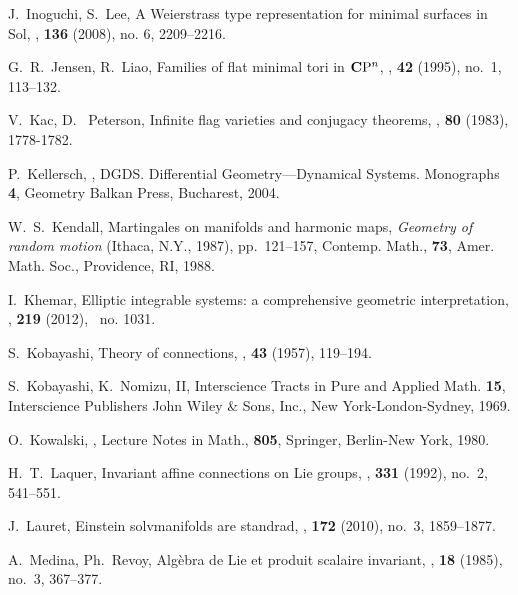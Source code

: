 \documentclass[12pt]{amsart}
\theoremstyle{definition}
\theoremstyle{remark}
\numberwithin{equation}{section}
\begin{document}
\begin{thebibliography}{10}
 J.~Inoguchi, S.~Lee,
 \newblock A {W}eierstrass type representation for minimal surfaces in {S}ol,
 , \textbf{136} (2008), no. 6, 2209--2216.

 G.~R.~Jensen,  R.~Liao,
 \newblock Families of flat minimal tori in {$\mathbf C{\rm P}^n$},
 , \textbf{42} (1995), no.~1, 113--132.

V.~Kac, D. ~Peterson, 
\newblock Infinite flag varieties and conjugacy theorems,
, \textbf{80} (1983), 1778-1782.

 P.~Kellersch, 
 ,
 \newblock DGDS. Differential Geometry---Dynamical Systems. Monographs \textbf{4},  
 Geometry Balkan Press, Bucharest, 2004.
 
 W.~S.~Kendall, 
 \newblock Martingales on manifolds and harmonic maps,
 \textit{Geometry of random motion} (Ithaca, N.Y., 1987), pp.~121--157, 
 Contemp. Math., \textbf{73}, Amer. Math. Soc., Providence, RI, 1988.
 
 I.~Khemar,
 \newblock Elliptic integrable systems: a comprehensive geometric interpretation, 
 , \textbf{219} (2012), ~no. 1031.

 S.~Kobayashi, 
 \newblock Theory of connections,
 , \textbf{43} (1957), 119--194. 

 S.~Kobayashi, K.~Nomizu,
  II, 
 Interscience Tracts in Pure and Applied Math. \textbf{15}, 
 \newblock Interscience Publishers John Wiley \& Sons, Inc., New York-London-Sydney, 1969. 

 O.~Kowalski,
 ,
 \newblock Lecture Notes in Math., \textbf{805}, Springer, Berlin-New York, 1980.

 H.~T.~Laquer, 
 \newblock Invariant affine connections on Lie groups, 
 , \textbf{331} (1992), no.~2, 541--551. 

 J.~Lauret,
 \newblock Einstein solvmanifolds are standrad,
 , \textbf{172} (2010), no.~3, 1859--1877.

 A.~Medina,  Ph.~Revoy,
 \newblock Alg\`ebra de Lie et produit scalaire invariant,
 ,  \textbf{18} (1985), no.~3, 367--377.


\end{thebibliography}
\end{document}
